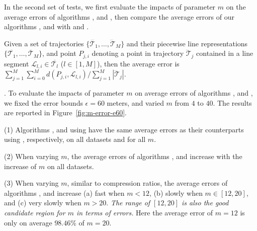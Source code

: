 In the second set of tests, we first evaluate the impacts of parameter $m$ on the average errors of algorithms \cisto, \cist and \cista, then compare the average errors of our algorithms \cisto, \cist and \cista with \dps and \squishe.

Given a set of trajectories $\{\dddot{\mathcal{T}_1}, \ldots, \dddot{\mathcal{T}}_M\}$ and their piecewise line representations $\{\overline{\mathcal{T}_1}, \ldots, \overline{\mathcal{T}}_M\}$, and point $P_{j,i}$ denoting
a point in trajectory $\dddot{\mathcal{T}}_j$ contained in a line segment $\mathcal{L}_{l,i}\in\overline{\mathcal{T}_l}$ ($l\in[1,M]$),
then the average error is $\sum_{j=1}^{M}\sum_{i=0}^{M} d(P_{j,i},
\mathcal{L}_{l,i})/\sum_{j=1}^{M}{|\dddot{\mathcal{T}}_j |}$.




.
To evaluate the impacts of parameter $m$ on average errors of algorithms \cisto, \cist and \cista, we fixed the error bounds {$\epsilon =60$ meters}, and varied $m$ from $4$ to $40$. The results are reported in Figure~\ref{fig:m-error-e60}.



\ni(1) Algorithms \cisto, \cist and \cista using \rpia have the same average errors as their counterparts using \cpia, respectively, on all datasets and for all $m$.

\ni(2) When varying $m$, the average errors of algorithms \cisto, \cist and \cista increase with the increase of $m$ on all datasets.

\ni(3) When varying $m$, similar to compression ratios, the average errors of
algorithms \cisto, \cist and \cista increase (a) fast when $m < 12$, (b) slowly when $m
\in [12, 20]$, and (c) very slowly when $m > 20$.
\emph{The range of $[12, 20]$ is also the good candidate region for $m$ in terms of errors.}
Here the average error of $m=12$ is only on average {$98.46\%$} of $m=20$.




